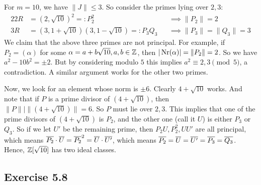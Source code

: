 \documentclass[../Marcus.tex]{subfiles}
\begin{document}
For $m=10$, we have $\|J\| \leq 3$. So consider the primes lying over $2,3$:
\begin{alignat*}{2}
2R &= (2,\sqrt{10})^2 =: P_2^2  &&\implies \|P_2\| = 2    \\
3R &= (3,1+\sqrt{10})(3,1-\sqrt{10}) =: P_3Q_3   &&\implies \|P_3\| = \|Q_3\| = 3
\end{alignat*}
We claim that the above three primes are not principal. For example, if $P_2 = (\alpha)$ for some $\alpha=a+b\sqrt{10},a,b\in \mathbb{Z}$, then $|\operatorname{Nr}(\alpha)| = \|P_2\| = 2$. So we have $a^2-10b^2 = \pm2$. But by considering modulo $5$ this implies $a^2 \equiv 2,3 \pmod{5}$, a contradiction. A similar argument works for the other two primes.

Now, we look for an element whose norm is $\pm6$. Clearly $4+\sqrt{10}$ works. And note that if $P$ is a prime divisor of $(4+\sqrt{10})$, then $\|P\| \mid \|(4+\sqrt{10})\| = 6$. So $P$ must lie over $2,3$. This implies that one of the prime divisors of $(4+\sqrt{10})$ is $P_2$, and the other one (call it $U$) is either $P_3$ or $Q_3$. So if we let $U'$ be the remaining prime, then $P_2U,P_2^2,UU'$ are all principal, which means $\overline{P_2} \cdot \overline{U} = \overline{P_2}^2 = \overline{U} \cdot \overline{U'}$, which means $\overline{P_2} = \overline{U}= \overline{U'} = \overline{P_3} = \overline{Q_3}$. Hence, $\mathbb{Z}[\sqrt{10}]$ has two ideal classes.

\subsection*{Exercise 5.8}

\begin{comment}
For $m=223$, we have $\|J\| \leq 14$. So consider the primes lying over $2,3,5,7,11,13$:
\begin{align*}
2R &= (2,1+\sqrt{223})^2   \\
3R &= (3,1+\sqrt{223})(3,1-\sqrt{223})    \\
5R &= \text{prime}    \\
7R &= \text{prime}    \\
11R &= (11,5+\sqrt{223})(11,5-\sqrt{223})    \\
13R &= \text{ prime}
\end{align*}

We look for an element whose norm is $\pm2$: $15+\sqrt{223}$ works. So $\|(15+\sqrt{223})\| = 2$, which is a prime. This implies $(15+\sqrt{223})$ is a prime lying over $2$. Hence, $(2,1+\sqrt{223}) = (15+\sqrt{223})$ is principal.
\end{comment}
\end{document}
